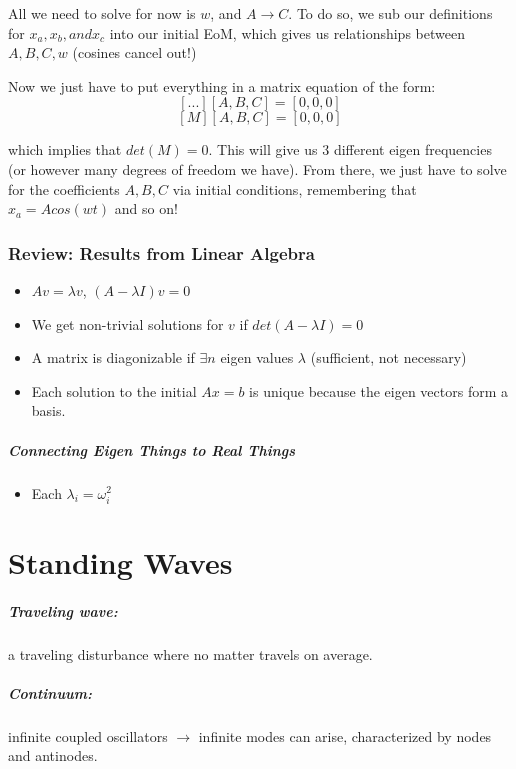 \documentclass[a4paper,12pt]{report}
\begin{document}
All we need to solve for now is $w$, and $A \to C$. To do so, we sub our definitions for $x_a, x_b, and x_c$ 
into our initial EoM, which gives us relationships between $A, B, C, w$ (cosines cancel out!)

Now we just have to put everything in a matrix equation of the form:
$$[...][A, B, C] = [0, 0, 0]$$
$$[M][A, B, C] = [0, 0, 0]$$

which implies that $det(M) = 0$. This will give us $3$ different eigen frequencies (or however many degrees 
of freedom we have). From there, we just have to solve for the coefficients $A, B, C$ via initial conditions, 
remembering that $x_a = Acos(wt)$ and so on!

\subsection{Review: Results from Linear Algebra}
\begin{itemize}
\item $Av = \lambda v$, $(A-\lambda I)v = 0$
\item We get non-trivial solutions for $v$ if $det(A - \lambda I) = 0$
\item A matrix is diagonizable if $\exists n$ eigen values $\lambda$ (sufficient, not necessary)
\item Each solution to the initial $Ax = b$ is unique because the eigen vectors form a basis.
\end{itemize}

\paragraph{Connecting Eigen Things to Real Things}
\begin{itemize}
\item Each $\lambda_i = \omega_i^2$
\end{itemize}

\chapter{Standing Waves}
\paragraph{Traveling wave: } a traveling disturbance where no matter travels on average.
\paragraph{Continuum: } infinite coupled oscillators $\to$ infinite modes can arise, characterized 
by nodes and antinodes.
\end{document}
